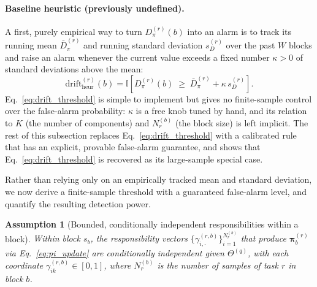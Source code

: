 ﻿\documentclass[12pt,a4paper]{article}
\newtheorem{assumption}{Assumption}
\begin{document}
\paragraph{Baseline heuristic (previously undefined).} A first, purely
empirical way to turn $D_\pi^{(r)}(b)$ into an alarm is to track its running
mean $\bar D_\pi^{(r)}$ and running standard deviation $s_D^{(r)}$ over the
past $W$ blocks and raise an alarm whenever the current value exceeds a
fixed number $\kappa>0$ of standard deviations above the mean:
\begin{equation}
	\text{drift}^{(r)}_{\text{heur}}(b) =
	\mathbb{I}\!\left[D_\pi^{(r)}(b) \;\geq\; \bar D_\pi^{(r)} + \kappa\, s_D^{(r)}\right].
	\label{eq:drift_threshold}
\end{equation}
Eq.~\eqref{eq:drift_threshold} is simple to implement but gives no
finite-sample control over the false-alarm probability: $\kappa$ is a free
knob tuned by hand, and its relation to $K$ (the number of components) and
$N_r^{(b)}$ (the block size) is left implicit. The rest of this subsection
replaces Eq.~\eqref{eq:drift_threshold} with a calibrated rule that has an
explicit, provable false-alarm guarantee, and shows that
Eq.~\eqref{eq:drift_threshold} is recovered as its large-sample special
case.

Rather than relying only on an empirically tracked mean and standard
deviation, we now derive a finite-sample threshold with a guaranteed
false-alarm level, and quantify the resulting detection power.

\begin{assumption}[Bounded, conditionally independent responsibilities within a block]
	\label{as:bounded_indep_v2}
	Within block $s_b$, the responsibility vectors
	$\{\gamma_{i,\cdot}^{(r,b)}\}_{i=1}^{N_r^{(b)}}$ that produce
	$\bm\pi_b^{(r)}$ via Eq.~\eqref{eq:pi_update} are conditionally
	independent given $\Theta^{(q)}$, with each coordinate
	$\gamma_{ik}^{(r,b)}\in[0,1]$, where $N_r^{(b)}$ is the number of samples
	of task $r$ in block $b$.
\end{assumption}
\end{document}
